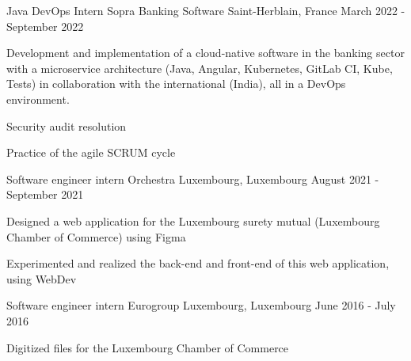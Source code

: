 
\begin{cventries}
  \cventry
    {Java DevOps Intern} %
    {Sopra Banking Software} %
    {Saint-Herblain, France} %
    {March 2022 - September 2022} %
    {
      \begin{cvitems} %
        \item {Development and implementation of a cloud-native software in the banking sector with a microservice architecture (Java, Angular, Kubernetes, GitLab CI, Kube, Tests) in collaboration with the international (India), all in a DevOps environment.}
        \item {Security audit resolution}
        \item {Practice of the agile SCRUM cycle}
      \end{cvitems}
    }
    
  \cventry
    {Software engineer intern} %
    {Orchestra} %
    {Luxembourg, Luxembourg} %
    {August 2021 - September 2021} %
    {
      \begin{cvitems} %
        \item {Designed a web application for the Luxembourg surety mutual (Luxembourg Chamber of Commerce) using Figma}
        \item {Experimented and realized the back-end and front-end of this web application, using WebDev}
      \end{cvitems}
    }

  \cventry
    {Software engineer intern} %
    {Eurogroup} %
    {Luxembourg, Luxembourg} %
    {June 2016 - July 2016} %
    {
      \begin{cvitems} %
        \item {Digitized files for the Luxembourg Chamber of Commerce}
      \end{cvitems}
    }

\end{cventries}
